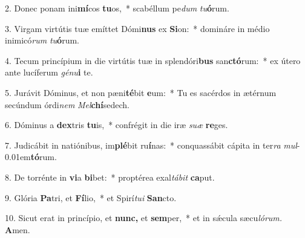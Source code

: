\item 2. Donec ponam ini\textbf{mí}cos \textbf{tu}os,~* scabéllum pe\hspace{0.03em}\textit{dum} \textit{tu}\textbf{ó}rum.
\item 3. Virgam virtútis tuæ emíttet Dómi\textbf{nus} ex \textbf{Si}on:~* domináre in médio inimicó\textit{rum} \textit{tu}\textbf{ó}rum.
\item 4. Tecum princípium in die virtútis tuæ in splendóri\textbf{bus} san\textbf{ctó}rum:~* ex útero ante lucíferum \textit{génu}\textbf{i} te.
\item 5. Jurávit Dóminus, et non pæni\textbf{té}bit \textbf{e}um:~* Tu es sacérdos in ætérnum secúndum órdi\textit{nem} \textit{Mel}\textbf{chí}sedech.
\item 6. Dóminus a \textbf{dex}tris \textbf{tu}is,~* confrégit in die iræ \textit{suæ} \textbf{re}ges.
\item 7. Judicábit in natiónibus, im\textbf{plé}bit ru\textbf{í}nas:~* conquassábit cápita in ter\textit{ra} \textit{mul}\kern-0.01em\textbf{tó}rum.
\item 8. De torrénte in \textbf{vi}a \textbf{bi}bet:~* proptérea exal\textit{tábit} \textbf{ca}put.
\item 9. Glória \textbf{Pa}tri, et \textbf{Fí}lio,~* et Spirí\hspace{0.03em}\textit{tu}\textit{i} \textbf{San}cto.
\item 10. Sicut erat in princípio, et \textbf{nunc,} et \textbf{sem}per,~* et in sǽcula sæcu\hspace{0.03em}\textit{lórum.} \textbf{A}men.